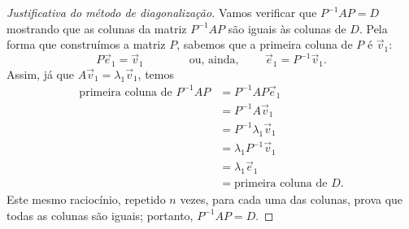 \begin{proof}[Justificativa do método de diagonalização]
Vamos verificar que $P^{-1} A P = D$ mostrando que as colunas da matriz $P^{-1} A P$ são iguais às colunas de $D$. Pela forma que construímos a matriz $P$, sabemos que a primeira coluna de $P$ é $\vec{v}_1$:
\begin{equation}
P \vec{e}_1 = \vec{v}_1 \qquad \qquad \text{ou, ainda, } \qquad  \vec{e}_1 = P^{-1} \vec{v}_1.
\end{equation} Assim, já que $A \vec{v}_1 = \lambda_1 \vec{v}_1$, temos
\begin{equation}
\begin{split}
\text{primeira coluna de } P^{-1} A P  & = P^{-1} A P \vec{e}_1 \\
                                       & = P^{-1} A \vec{v}_1 \\
                                       & = P^{-1} \lambda_1 \vec{v}_1 \\
                                       & = \lambda_1 P^{-1} \vec{v}_1 \\
                                       & = \lambda_1 \vec{e}_1 \\
                                       & = \text{primeira coluna de } D.
\end{split}
\end{equation}
Este mesmo raciocínio, repetido $n$ vezes, para cada uma das colunas, prova que todas as colunas são iguais; portanto, $P^{-1} A P = D$.
\end{proof}

